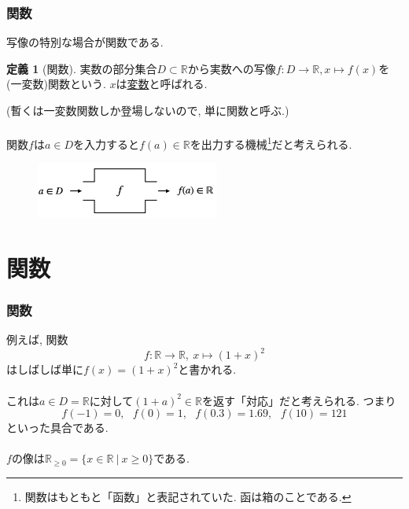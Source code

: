 \documentclass[dvipdfmx,cjk,10.2pt]{beamer}
\newcommand{\R}{\mathbb{R}}
\theoremstyle{definition}
\newtheorem{Def}[Thm]{定義}
\begin{document}
\begin{frame}
\frametitle{関数} 

 写像の特別な場合が関数である. 

\begin{Def}[関数]
実数の部分集合$D \subset \R$から実数への写像$f:D \rightarrow \R, x\mapsto f(x)$を(一変数)関数という. 
$x$は\underline{変数}と呼ばれる. 
\end{Def}
(暫くは一変数関数しか登場しないので, 単に関数と呼ぶ.) \\
\ \\

関数$f$は$a \in D$を入力すると$f(a) \in \R$を出力する機械\footnote{関数はもともと「函数」と表記されていた. 函は箱のことである.}だと考えられる.  

\vspace{-2mm}

 \begin{figure}[htbp]
 \begin{center} 
  \includegraphics[width=60mm]{function.png}
 \end{center}
\end{figure}

\vspace{-2mm}

\end{frame}




\section{関数}

\begin{frame}
\frametitle{関数}   



例えば, 関数
$$
f: \R \longrightarrow \R, \ x \mapsto (1+x)^2
$$
はしばしば単に$f(x)=(1+x)^2$と書かれる. \\
\ \\

これは$a \in D=\R$に対して$(1+a)^2 \in \R$を返す「対応」だと考えられる. 
つまり
$$
f(-1)=0, \ \ \ f(0)=1, \ \ \ f(0.3)=1.69, \ \ \ f(10)=121
$$
といった具合である. \\
\ \\

$f$の像は$\R_{\ge 0}=\{x \in \R \ | \ x \ge 0\}$である. 

\end{frame}
\end{document}
